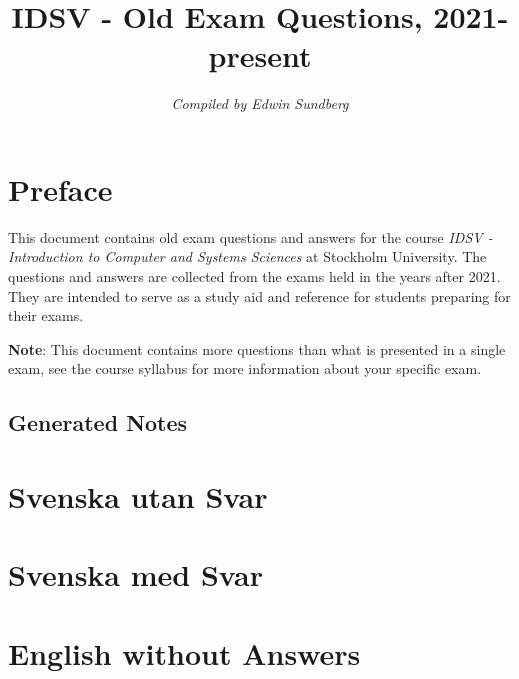 \documentclass[a4paper,11pt,oneside]{article}
\title{IDSV - Old Exam Questions, 2021-present}
\author{\textit{Compiled by Edwin Sundberg}}
\begin{document}
\maketitle \pagebreak

\begin{sloppypar}  

\tableofcontents \pagebreak

\section{Preface}
\label{preface}
This document contains old exam questions and answers for the course \textit{IDSV - Introduction to Computer and Systems Sciences} at Stockholm University. The questions and answers are collected from the exams held in the years after 2021. They are intended to serve as a study aid and reference for students preparing for their exams.


\textbf{Note}: This document contains more questions than what is presented in a single exam, see the course syllabus for more information about your specific exam.


\subsection{Generated Notes}
\label{generatedNotes}



\section{Svenska utan Svar}
\label{svenskaUtanSvar}


\section{Svenska med Svar}
\label{svenska}


\section{English without Answers}
\label{englishWithoutAnswers}



\end{sloppypar}
\end{document}
